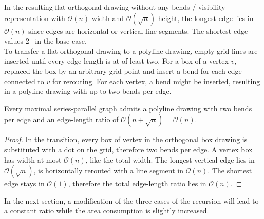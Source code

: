 In the resulting flat orthogonal drawing without any bends / visibility representation with $\mathcal{O}(n)$ width and $\mathcal{O}(\sqrt{n})$ height, the longest edge lies in $\mathcal{O}(n)$ since edges are horizontal or vertical line segments. The shortest edge values 2 \UL~in the base case.
\bigskip\\
To transfer a flat orthogonal drawing to a polyline drawing, empty grid lines are inserted until every edge length is at of least two. For a box of a vertex $v$, replaced the box by an arbitrary grid point and insert a bend for each edge connected to $v$ for rerouting. For each vertex, a bend might be inserted, resulting in a polyline drawing with up to two bends per edge.
\begin{lemma}
	Every maximal series-parallel graph admits a polyline drawing with two bends per edge and an edge-length ratio of $\mathcal{O}(n + \sqrt{n}) = \mathcal{O}(n)$.
\end{lemma}
\begin{proof}
	In the transition, every box of vertex in the orthogonal box drawing is substituted with a dot on the grid, therefore two bends per edge. A vertex box has width at most $\mathcal{O}(n)$, like the total width. The longest vertical edge lies in $\mathcal{O}(\sqrt{n})$, is horizontally rerouted with a line segment in $\mathcal{O}(n)$. The shortest edge stays in $\mathcal{O}(1)$, therefore the total edge-length ratio lies in $\mathcal{O}(n)$.
\end{proof}
In the next section, a modification of the three cases of the recursion will lead to a constant ratio while the area consumption is slightly increased.
